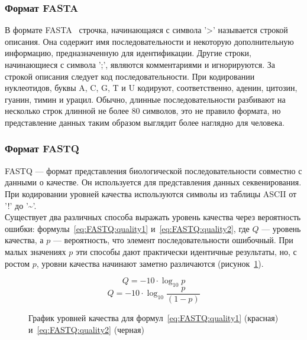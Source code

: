 \subsubsection[Формат FASTA]{\large Формат FASTA}
\hspace{\parindent} В формате FASTA~\cite{FASTAformat} строчка, начинающаяся с символа '>' называется строкой описания. Она содержит имя последовательности и некоторую дополнительную информацию, предназначенную для идентификации. Другие строки, начинающиеся с символа ';', являются комментариями и игнорируются. За строкой описания следует код последовательности. При кодировании нуклеотидов, буквы A, C, G, T и U кодируют, соответственно, аденин, цитозин, гуанин, тимин и урацил. Обычно, длинные последовательности разбивают на несколько строк длинной не более 80 символов, это не правило формата, но представление данных таким образом выглядит более наглядно для человека.

\subsubsection[Формат FASTQ]{\large Формат FASTQ}
\hspace{\parindent} FASTQ --- формат представления биологической последовательности совместно с данными о качестве. Он используется для представления данных секвенирования. При кодировании уровней качества используются символы из таблицы ASCII от '!' до '\textasciitilde'.\\
\indent Существует два различных способа выражать уровень качества через вероятность ошибки: формулы~\ref{eq:FASTQ:quality1} и~\ref{eq:FASTQ:quality2}, где $Q$ --- уровень качества, а $p$ --- вероятность, что элемент последовательности ошибочный. При малых значениях $p$ эти способы дают практически идентичные результаты, но, с ростом $p$, уровни качества начинают заметно различаются (рисунок~\ref{ris:FASTQscore}).

\begin{equation} \label{eq:FASTQ:quality1}
Q = -10 \cdot \log_{10} p
\end{equation}
\begin{equation} \label{eq:FASTQ:quality2}
Q = -10 \cdot \log_{10} \dfrac{p}{(1-p)}
\end{equation}
\begin{figure}[h]
	\caption{График уровней качества для формул~\ref{eq:FASTQ:quality1} (красная) и~\ref{eq:FASTQ:quality2} (черная)}
	\label{ris:FASTQscore}
\end{figure}

